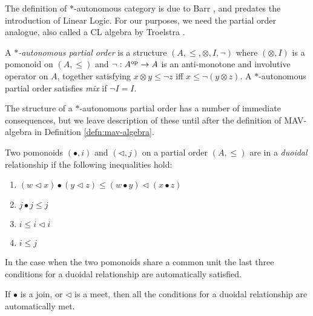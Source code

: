 The definition of $*$-autonomous category is due to Barr
\cite{Barr_1979}, and predates the introduction of Linear Logic. For
our purposes, we need the partial order analogue, also called a CL
algebra by Troelstra \cite{Troelstra92:lll}.

\begin{definition}
  A \emph{$*$-autonomous partial order} is a structure
  $(A, \leq, \otimes, I, \lnot)$ where $(\otimes, I)$ is a pomonoid on
  $(A, \leq)$ and $\lnot : A^{\mathrm{op}} \to A$ is an anti-monotone and
  involutive operator on $A$, together satisfying
  $x \otimes y \leq \lnot z$ iff $x \leq \lnot (y \otimes z)$.  A
  $*$-autonomous partial order satisfies \emph{mix} if $\lnot I = I$.
\end{definition}

\begin{remark}
  The structure of a $*$-autonomous partial order has a number of
  immediate consequences, but we leave description of these until
  after the definition of MAV-algebra in Definition
  \ref{defn:mav-algebra}.
\end{remark}



\begin{definition}
  Two pomonoids $(\bullet, i)$ and $(\lhd, j)$ on a partial order
  $(A, \leq)$ are in a \emph{duoidal} relationship if the following
  inequalities hold:
  \begin{enumerate}
    \item $(w \lhd x) \bullet (y \lhd z) \leq (w \bullet y) \lhd (x \bullet z)$
    \item $j \bullet j \leq j$
    \item $i \leq i \lhd i$
    \item $i \leq j$
  \end{enumerate}
\end{definition}

\begin{remark}
  In the case when the two pomonoids share a common unit the last
  three conditions for a duoidal relationship are automatically
  satisfied.
\end{remark}

\begin{remark}
  If $\bullet$ is a join, or $\lhd$ is a meet, then all the conditions
  for a duoidal relationship are automatically met.
\end{remark}

